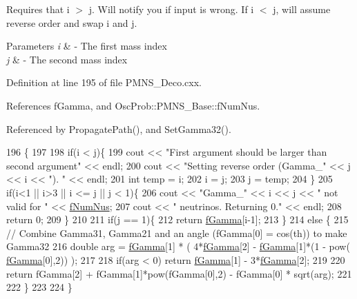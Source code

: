 Requires that i $>$ j. Will notify you if input is wrong. If i $<$ j, will assume reverse order and swap i and j.


\begin{DoxyParams}{Parameters}
{\em i} & -\/ The first mass index \\
\hline
{\em j} & -\/ The second mass index \\
\hline
\end{DoxyParams}


Definition at line 195 of file P\+M\+N\+S\+\_\+\+Deco.\+cxx.



References f\+Gamma, and Osc\+Prob\+::\+P\+M\+N\+S\+\_\+\+Base\+::f\+Num\+Nus.



Referenced by Propagate\+Path(), and Set\+Gamma32().


\begin{DoxyCode}
196 \{
197 
198   \textcolor{keywordflow}{if}(i < j)\{
199     cout << \textcolor{stringliteral}{"First argument should be larger than second argument"} << endl;
200     cout << \textcolor{stringliteral}{"Setting reverse order (Gamma\_"} << j << i << \textcolor{stringliteral}{"). "} << endl;
201     \textcolor{keywordtype}{int} temp = i;
202     i = j;
203     j = temp;
204   \}
205   \textcolor{keywordflow}{if}(i<1 || i>3 || i <= j || j < 1)\{
206     cout << \textcolor{stringliteral}{"Gamma\_"} << i << j << \textcolor{stringliteral}{" not valid for "} << \hyperlink{classOscProb_1_1PMNS__Base_a24bb74bed63569dfe88b18fa6a08060e}{fNumNus};
207     cout << \textcolor{stringliteral}{" neutrinos. Returning 0."} << endl;
208     \textcolor{keywordflow}{return} 0;
209   \}
210 
211   \textcolor{keywordflow}{if}(j == 1)\{ 
212     \textcolor{keywordflow}{return} \hyperlink{classOscProb_1_1PMNS__Deco_ae2f30ac9f8b25344959f1698616d337a}{fGamma}[i-1];
213   \}
214   \textcolor{keywordflow}{else} \{
215     \textcolor{comment}{// Combine Gamma31, Gamma21 and an angle (fGamma[0] = cos(th)) to make Gamma32}
216     \textcolor{keywordtype}{double} arg = \hyperlink{classOscProb_1_1PMNS__Deco_ae2f30ac9f8b25344959f1698616d337a}{fGamma}[1] * ( 4*\hyperlink{classOscProb_1_1PMNS__Deco_ae2f30ac9f8b25344959f1698616d337a}{fGamma}[2] - \hyperlink{classOscProb_1_1PMNS__Deco_ae2f30ac9f8b25344959f1698616d337a}{fGamma}[1]*(1 - pow(
      \hyperlink{classOscProb_1_1PMNS__Deco_ae2f30ac9f8b25344959f1698616d337a}{fGamma}[0],2)) );
217     
218     \textcolor{keywordflow}{if}(arg < 0) \textcolor{keywordflow}{return} \hyperlink{classOscProb_1_1PMNS__Deco_ae2f30ac9f8b25344959f1698616d337a}{fGamma}[1] - 3*\hyperlink{classOscProb_1_1PMNS__Deco_ae2f30ac9f8b25344959f1698616d337a}{fGamma}[2];
219 
220     \textcolor{keywordflow}{return} fGamma[2] + fGamma[1]*pow(fGamma[0],2) - fGamma[0] * sqrt(arg);
221 
222   \}
223 
224 \}
\end{DoxyCode}
\mbox{\label{classOscProb_1_1PMNS__Base_a2f7f2a028dfe7a90fff6b4f757972c2c}} 
